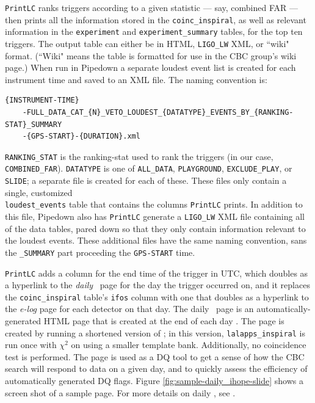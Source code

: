 \texttt{PrintLC} ranks triggers according to a given statistic --- say, combined
\ac{FAR} --- then prints all the information stored in the
\verb|coinc_inspiral|, as well as relevant information in the \verb|experiment|
and \verb|experiment_summary| tables, for the top ten triggers. The output
table can either be in HTML, \verb|LIGO_LW| XML, or ``wiki" format. (``Wiki"
means the table is formatted for use in the \ac{CBC} group's wiki page.) When
run in Pipedown a separate loudest event list is created for each instrument
time and saved to an XML file. The naming convention is:
\begin{footnotesize}
\begin{verbatim}
{INSTRUMENT-TIME}
    -FULL_DATA_CAT_{N}_VETO_LOUDEST_{DATATYPE}_EVENTS_BY_{RANKING-STAT}_SUMMARY
    -{GPS-START}-{DURATION}.xml
\end{verbatim}
\end{footnotesize}

\verb|RANKING_STAT| is the ranking-stat used to rank the triggers (in our case, \\
\verb|COMBINED_FAR|). \verb|DATATYPE| is one of \verb|ALL_DATA|,
\verb|PLAYGROUND|, \verb|EXCLUDE_PLAY|, or \verb|SLIDE|; a separate file is
created for each of these. These files only contain a single, customized \\
\verb|loudest_events| table that contains the columns \texttt{PrintLC} prints. In
addition to this file, Pipedown also has \texttt{PrintLC} generate a \verb|LIGO_LW| XML
file containing all of the data tables, pared down so that they only contain
information relevant to the loudest events. These additional files have the
same naming convention, sans the \verb|_SUMMARY| part proceeding the
\verb|GPS-START| time.

\texttt{PrintLC} adds a column for the end time of the trigger in UTC, which doubles as
a hyperlink to the \emph{daily} \ihope~page for the day the trigger occurred
on, and it replaces the \verb|coinc_inspiral| table's \verb|ifos| column with
one that doubles as a hyperlink to the \emph{e-log} page for each detector on
that day. The daily \ihope~page is an automatically-generated HTML page that is
created at the end of each day \cite{Pekowsky:thesis}. The page is created by
running a shortened version of \ihope; in this version, \verb|lalapps_inspiral|
is run once with $\chi^2$ on using a smaller template bank. Additionally, no
coincidence test is performed. The page is used as a \ac{DQ} tool to get a
sense of how the \ac{CBC} search will respond to data on a given day, and to
quickly assess the efficiency of automatically generated \ac{DQ} flags. Figure
\ref{fig:sample-daily_ihope-slide} shows a screen shot of a sample page. For
more details on daily \ihope, see \cite{Pekowsky:thesis}.


